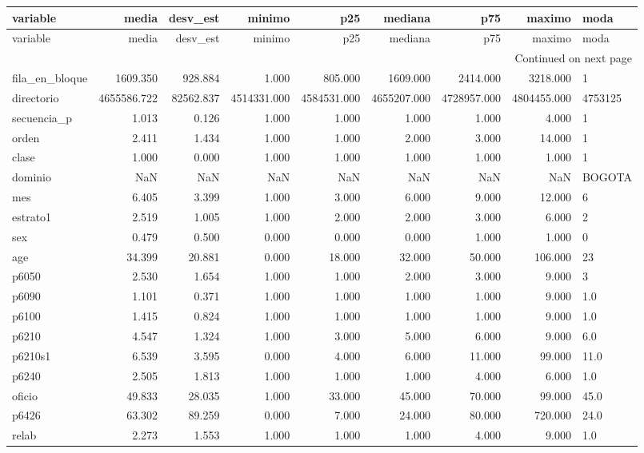 \begin{longtable}{lrrrrrrrl}
\toprule
variable & media & desv\_est & minimo & p25 & mediana & p75 & maximo & moda \\
\midrule
\endfirsthead
\toprule
variable & media & desv\_est & minimo & p25 & mediana & p75 & maximo & moda \\
\midrule
\endhead
\midrule
\multicolumn{9}{r}{Continued on next page} \\
\midrule
\endfoot
\bottomrule
\endlastfoot
fila\_en\_bloque & 1609.350 & 928.884 & 1.000 & 805.000 & 1609.000 & 2414.000 & 3218.000 & 1 \\
directorio & 4655586.722 & 82562.837 & 4514331.000 & 4584531.000 & 4655207.000 & 4728957.000 & 4804455.000 & 4753125 \\
secuencia\_p & 1.013 & 0.126 & 1.000 & 1.000 & 1.000 & 1.000 & 4.000 & 1 \\
orden & 2.411 & 1.434 & 1.000 & 1.000 & 2.000 & 3.000 & 14.000 & 1 \\
clase & 1.000 & 0.000 & 1.000 & 1.000 & 1.000 & 1.000 & 1.000 & 1 \\
dominio & NaN & NaN & NaN & NaN & NaN & NaN & NaN & BOGOTA \\
mes & 6.405 & 3.399 & 1.000 & 3.000 & 6.000 & 9.000 & 12.000 & 6 \\
estrato1 & 2.519 & 1.005 & 1.000 & 2.000 & 2.000 & 3.000 & 6.000 & 2 \\
sex & 0.479 & 0.500 & 0.000 & 0.000 & 0.000 & 1.000 & 1.000 & 0 \\
age & 34.399 & 20.881 & 0.000 & 18.000 & 32.000 & 50.000 & 106.000 & 23 \\
p6050 & 2.530 & 1.654 & 1.000 & 1.000 & 2.000 & 3.000 & 9.000 & 3 \\
p6090 & 1.101 & 0.371 & 1.000 & 1.000 & 1.000 & 1.000 & 9.000 & 1.0 \\
p6100 & 1.415 & 0.824 & 1.000 & 1.000 & 1.000 & 1.000 & 9.000 & 1.0 \\
p6210 & 4.547 & 1.324 & 1.000 & 3.000 & 5.000 & 6.000 & 9.000 & 6.0 \\
p6210s1 & 6.539 & 3.595 & 0.000 & 4.000 & 6.000 & 11.000 & 99.000 & 11.0 \\
p6240 & 2.505 & 1.813 & 1.000 & 1.000 & 1.000 & 4.000 & 6.000 & 1.0 \\
oficio & 49.833 & 28.035 & 1.000 & 33.000 & 45.000 & 70.000 & 99.000 & 45.0 \\
p6426 & 63.302 & 89.259 & 0.000 & 7.000 & 24.000 & 80.000 & 720.000 & 24.0 \\
relab & 2.273 & 1.553 & 1.000 & 1.000 & 1.000 & 4.000 & 9.000 & 1.0 \\

\end{longtable}
